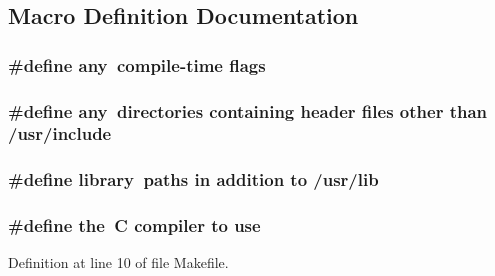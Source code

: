 \subsection{Macro Definition Documentation}
\hypertarget{ClientServer_2client_2Makefile_a6120b6f1abea66c8ede7b300a66d4cc0}{
\subsubsection[{any}]{\setlength{\rightskip}{0pt plus 5cm}\#define any~compile-\/time flags}}\label{ClientServer_2client_2Makefile_a6120b6f1abea66c8ede7b300a66d4cc0}
\hypertarget{ClientServer_2client_2Makefile_a6120b6f1abea66c8ede7b300a66d4cc0}{
\subsubsection[{any}]{\setlength{\rightskip}{0pt plus 5cm}\#define any~directories containing header files other than /usr/include}}\label{ClientServer_2client_2Makefile_a6120b6f1abea66c8ede7b300a66d4cc0}
\hypertarget{ClientServer_2client_2Makefile_a1f477410360bd4832116581b9934ab71}{
\subsubsection[{library}]{\setlength{\rightskip}{0pt plus 5cm}\#define library~paths in addition to /usr/lib}}\label{ClientServer_2client_2Makefile_a1f477410360bd4832116581b9934ab71}
\hypertarget{ClientServer_2client_2Makefile_a09c6b60bb7451f9136e25140ffdff6bd}{
\subsubsection[{the}]{\setlength{\rightskip}{0pt plus 5cm}\#define the~C compiler to use}}\label{ClientServer_2client_2Makefile_a09c6b60bb7451f9136e25140ffdff6bd}


Definition at line 10 of file Makefile.

